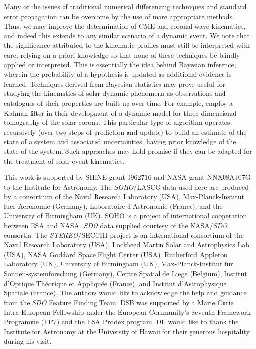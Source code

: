 \documentclass[referee]{aa}
\begin{document}
Many of the issues of traditional numerical differencing techniques and standard error propagation can be overcome by the use of more appropriate methods. Thus, we may improve the determination of CME and coronal wave kinematics, and indeed this extends to any similar scenario of a dynamic event. We note that the significance attributed to the kinematic profiles must still be interpreted with care, relying on a priori knowledge so that none of these techniques be blindly applied or interpreted. This is essentially the idea behind Bayesian inference, wherein the probability of a hypothesis is updated as additional evidence is learned. Techniques derived from Bayesian statistics may prove useful for studying the kinematics of solar dynamic phenomena as observations and catalogues of their properties are built-up over time. For example, \citet{2010SoPh..262..495B} employ a Kalman filter in their development of a dynamic model for three-dimensional tomography of the solar corona. This particular type of algorithm operates recursively (over two steps of prediction and update) to build an estimate of the state of a system and associated uncertainties, having prior knowledge of the state of the system. Such approaches may hold promise if they can be adapted for the treatment of solar event kinematics.


\begin{acknowledgements}
This work is supported by SHINE grant 0962716 and NASA grant NNX08AJ07G to the Institute for Astronomy. The \emph{SOHO}/LASCO data used here are produced by a consortium of the Naval Research Laboratory (USA), Max-Planck-Institut fuer Aeronomie (Germany), Laboratoire d'Astronomie (France), and the University of Birmingham (UK). SOHO is a project of international cooperation between ESA and NASA. \emph{SDO} data supplied courtesy of the NASA/\emph{SDO} consortia. The \emph{STEREO}/SECCHI project is an international consortium of the Naval Research Laboratory (USA), Lockheed Martin Solar and Astrophysics Lab (USA), NASA Goddard Space Flight Center (USA), Rutherford Appleton Laboratory (UK), University of Birmingham (UK), Max-Planck-Institut f\"{u}r Sonnen-systemforschung (Germany), Centre Spatial de Liege (Belgium), Institut d'Optique Th\'{e}orique et Appliqu\'{e}e (France), and Institut d'Astrophysique Spatiale (France). The authors would like to acknowledge the help and guidance from the \emph{SDO} Feature Finding Team. DSB was supported by a Marie Curie Intra-European Fellowship under the European Community's Seventh Framework Programme (FP7) and the ESA Prodex program. DL would like to thank the Institute for Astronomy at the University of Hawaii for their generous hospitality during his visit.
\end{acknowledgements}




  
\end{document}

